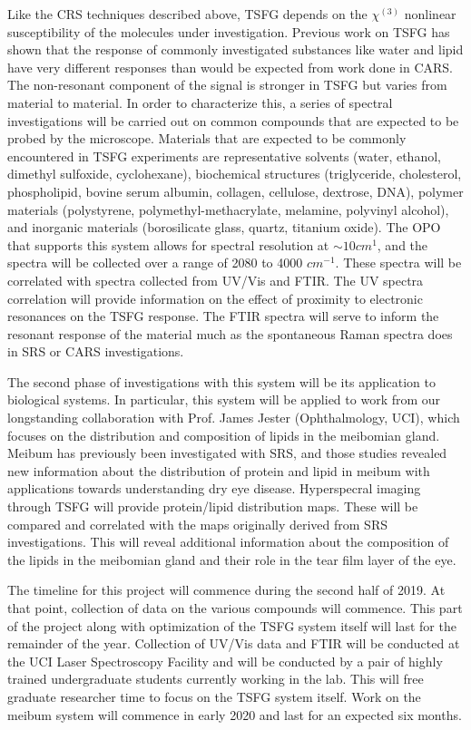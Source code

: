 Like the CRS techniques described above, TSFG depends on the  $\chi^(3)$ nonlinear susceptibility of the molecules under investigation.  Previous work on TSFG has shown that the response of commonly investigated substances like water and lipid have very different responses than would be expected from work done in CARS.  The non-resonant component of the signal is stronger in TSFG but varies from material to material. In order to characterize this, a series of spectral investigations will be carried out on common compounds that are expected to be probed by the microscope. Materials that are expected to be commonly encountered in TSFG experiments are representative solvents (water, ethanol, dimethyl sulfoxide, cyclohexane), biochemical structures (triglyceride, cholesterol, phospholipid, bovine serum albumin, collagen, cellulose, dextrose, DNA), polymer materials (polystyrene, polymethyl-methacrylate, melamine, polyvinyl alcohol), and inorganic materials (borosilicate glass, quartz, titanium oxide). The OPO that supports this system allows for spectral resolution at $\sim10cm{^1}$, and the spectra will be collected over a range of 2080 to 4000 $cm^{-1}$.  These spectra will be correlated with spectra collected from UV/Vis and FTIR.  The UV spectra correlation will provide information on the effect of proximity to electronic resonances on the TSFG response.  The FTIR spectra will serve to inform the resonant response of the material much as the spontaneous Raman spectra does in SRS or CARS investigations.

The second phase of investigations with this system will be its application to biological systems.  In particular, this system will be applied to work from our longstanding collaboration with Prof. James Jester (Ophthalmology, UCI), which focuses on the distribution and composition of lipids in the meibomian gland.  Meibum has previously been investigated with SRS, and those studies revealed new information about the distribution of protein and lipid in meibum with applications towards understanding dry eye disease.  Hyperspecral imaging through TSFG will provide protein/lipid distribution maps.  These will be compared and correlated with the maps originally derived from SRS investigations.  This will reveal additional information about the composition of the lipids in the meibomian gland and their role in the tear film layer of the eye.

The timeline for this project will commence during the second half of 2019.  At that point, collection of data on the various compounds will commence.  This part of the project along with optimization of the TSFG system itself will last for the remainder of the year.  Collection of UV/Vis data and FTIR will be conducted at the UCI Laser Spectroscopy Facility and will be conducted by a pair of highly trained undergraduate students currently working in the lab.  This will free graduate researcher time to focus on the TSFG system itself. Work on the meibum system will commence in early 2020 and last for an expected six months.
